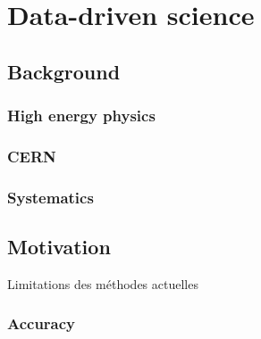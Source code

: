 
\chapter{Data-driven science}  %
\label{chap:intro_phy}
\ifpdf
    \graphicspath{{Chapter1/Figs/Raster/}{Chapter1/Figs/PDF/}{Chapter1/Figs/}}
\else
    \graphicspath{{Chapter1/Figs/Vector/}{Chapter1/Figs/}}
\fi





\section{Background}


\subsection{High energy physics} %
\label{sub:high_energy_physics}

\subsection{CERN} %
\label{sub:cern}


\subsection{Systematics} %
\label{sub:systematics}



\section{Motivation} %
\label{sec:motivation}

Limitations des méthodes actuelles

\subsection{Accuracy} %
\label{sub:accuracy}


